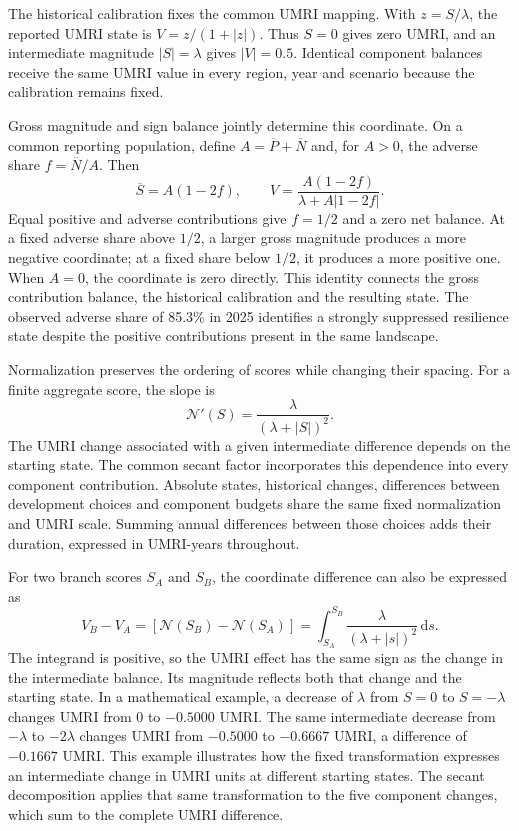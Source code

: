 The historical calibration fixes the common UMRI mapping. With $z=S/\lambda$, the reported UMRI state is $V=z/(1+|z|)$. Thus $S=0$ gives zero UMRI, and an intermediate magnitude $|S|=\lambda$ gives $|V|=0.5$. Identical component balances receive the same UMRI value in every region, year and scenario because the calibration remains fixed.

Gross magnitude and sign balance jointly determine this coordinate. On a common reporting population, define $A=\overline P+\overline N$ and, for $A>0$, the adverse share $f=\overline N/A$. Then
\[
\overline S=A(1-2f),\qquad
V=\frac{A(1-2f)}{\lambda+A|1-2f|}.
\]
Equal positive and adverse contributions give $f=1/2$ and a zero net balance. At a fixed adverse share above $1/2$, a larger gross magnitude produces a more negative coordinate; at a fixed share below $1/2$, it produces a more positive one. When $A=0$, the coordinate is zero directly. This identity connects the gross contribution balance, the historical calibration and the resulting state. The observed adverse share of 85.3\% in 2025 identifies a strongly suppressed resilience state despite the positive contributions present in the same landscape.

Normalization preserves the ordering of scores while changing their spacing. For a finite aggregate score, the slope is
\begin{equation}\label{eq:si_normalization_slope}
\mathcal{N}'(S)=\frac{\lambda}{(\lambda+|S|)^2}.
\end{equation}
The UMRI change associated with a given intermediate difference depends on the starting state. The common secant factor incorporates this dependence into every component contribution. Absolute states, historical changes, differences between development choices and component budgets share the same fixed normalization and UMRI scale. Summing annual differences between those choices adds their duration, expressed in UMRI-years throughout.

For two branch scores $S_A$ and $S_B$, the coordinate difference can also be expressed as
\[
V_B-V_A=[\mathcal{N}(S_B)-\mathcal{N}(S_A)]
=\int_{S_A}^{S_B}\frac{\lambda}{(\lambda+|s|)^2}\,\mathrm{d}s.
\]
The integrand is positive, so the UMRI effect has the same sign as the change in the intermediate balance. Its magnitude reflects both that change and the starting state. In a mathematical example, a decrease of $\lambda$ from $S=0$ to $S=-\lambda$ changes UMRI from 0 to $-0.5000$ UMRI. The same intermediate decrease from $-\lambda$ to $-2\lambda$ changes UMRI from $-0.5000$ to $-0.6667$ UMRI, a difference of $-0.1667$ UMRI. This example illustrates how the fixed transformation expresses an intermediate change in UMRI units at different starting states. The secant decomposition applies that same transformation to the five component changes, which sum to the complete UMRI difference.

